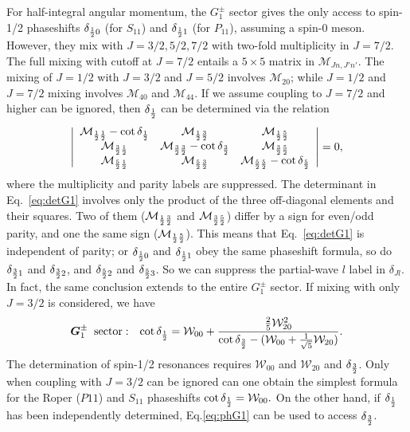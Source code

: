 \documentclass[aps,prd,reprint,showpacs,floatfix,longbibliography,,superscriptaddress]{revtex4-1}
\def\mw{\mathcal{W}}
\def\mm{\mathcal{M}}
\def\beq{\begin{equation}}
\def\eeq{\end{equation}}
\begin{document}
\begin{widetext}
For half-integral angular momentum, the $G^\pm_1$ sector gives the only access to spin-1/2 phaseshifts $\delta_{{1\over 2} 0}$ (for $S_{11}$)  
and $\delta_{{1\over 2} 1}$ (for $P_{11}$), assuming a spin-0 meson. 
However, they mix with $J=3/2, 5/2, 7/2$ with two-fold multiplicity in $J=7/2$. 
The full mixing with cutoff at $J=7/2$ entails a $5\times 5$ matrix in $\mm_{J n , J' n' } $. 
The mixing of $J=1/2$ with $J=3/2$ and $J=5/2$ involves $\mm_{20}$; while $J=1/2$ and $J=7/2$ mixing involves $\mm_{40}$ and $\mm_{44}$.
If we assume coupling to $J=7/2$ and higher can be ignored, then $\delta_{1\over2}$ can be determined via the relation
%                                     
\beq                                                     
\left |                                     
\begin{array}{ccc}                                     
\mm_{{1\over 2}{1\over 2}} - \cot\delta_{{1\over 2}} & \mm_{{1\over 2}{3\over 2}}                           & \mm_{{1\over 2}{5\over 2}} \\
\mm_{{3\over 2}{1\over 2}}                           & \mm_{{3\over 2}{3\over 2}} - \cot\delta_{{3\over 2}} & \mm_{{3\over 2}{5\over 2}} \\
\mm_{{5\over 2}{1\over 2}}                           & \mm_{{5\over 2}{3\over 2}}                           & \mm_{{5\over 2}{5\over 2}} - \cot\delta_{{5\over 2}}
\end{array}                                              
\right |                                           
=0,                                                      
\label{eq:detG1} 
\eeq
%
where the multiplicity and parity labels are suppressed. 
The determinant in Eq.~\ref{eq:detG1} involves only the product of the three off-diagonal elements and their squares. 
Two of them ($ \mm_{{1\over 2}{3\over 2}} $ and $ \mm_{{3\over 2}{5\over 2}} $) differ by a sign for even/odd parity, 
and one the same sign ($ \mm_{{1\over 2}{5\over 2}} $). This means that Eq.~\ref{eq:detG1}  is independent of parity; or
 $\delta_{{1\over 2} 0}$ and $\delta_{{1\over 2} 1}$ obey the same phaseshift formula, so do 
$\delta_{{3\over 2} 1}$ and $\delta_{{3\over 2} 2}$, and $\delta_{{5\over 2} 2}$ and $\delta_{{5\over 2} 3}$. 
So we can suppress the partial-wave $l$ label in $\delta_{Jl}$.
In fact, the same conclusion extends to the entire $G^\pm_1$ sector. 
If mixing with only $J=3/2$ is considered, we have
%
\beq
 {\bm G^\pm_1 \;\;\text{sector}:}  \;\;\;
\cot\delta_{1\over 2} 
= \mw_{00} 
+  { \frac{2}{5} \mw^2_{20} \over \cot\delta_{3\over 2} - (\mw_{00}+\frac{1}{\sqrt{5}} \mw_{20})  }. 
\label{eq:phG1}
\eeq
The determination of spin-1/2 resonances requires $\mw_{00}$ and $\mw_{20}$ and $\delta_{3\over 2}$.
Only when coupling with $J=3/2$ can be ignored can one obtain the simplest formula for the Roper ($P11$) and $S_{11}$ phaseshifts 
$\cot\delta_{1\over 2} = \mw_{00}.$ %
On the other hand, if $\delta_{1\over 2}$ has been independently determined, Eq.\ref{eq:phG1} can be used to access $\delta_{3\over 2}$.
%


\end{widetext}
\end{document}
